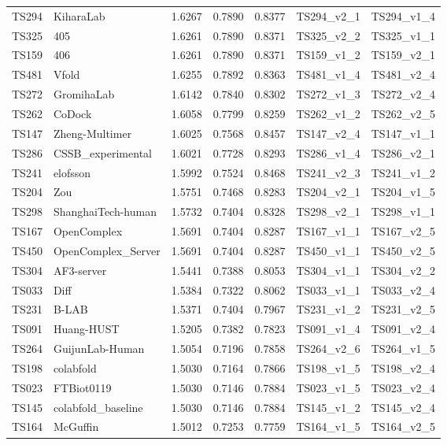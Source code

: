 \begin{table}[ht]
{\begin{tabular}{llrrrll}
TS294 & KiharaLab & 1.6267 & 0.7890 & 0.8377 & TS294\_v2\_1 & TS294\_v1\_4 \\ 
TS325 & 405 & 1.6261 & 0.7890 & 0.8371 & TS325\_v2\_2 & TS325\_v1\_1 \\ 
TS159 & 406 & 1.6261 & 0.7890 & 0.8371 & TS159\_v1\_2 & TS159\_v2\_1 \\ 
TS481 & Vfold & 1.6255 & 0.7892 & 0.8363 & TS481\_v1\_4 & TS481\_v2\_4 \\ 
TS272 & GromihaLab & 1.6142 & 0.7840 & 0.8302 & TS272\_v1\_3 & TS272\_v2\_4 \\ 
TS262 & CoDock & 1.6058 & 0.7799 & 0.8259 & TS262\_v1\_2 & TS262\_v2\_5 \\ 
TS147 & Zheng-Multimer & 1.6025 & 0.7568 & 0.8457 & TS147\_v2\_4 & TS147\_v1\_1 \\ 
TS286 & CSSB\_experimental & 1.6021 & 0.7728 & 0.8293 & TS286\_v1\_4 & TS286\_v2\_1 \\ 
TS241 & elofsson & 1.5992 & 0.7524 & 0.8468 & TS241\_v2\_3 & TS241\_v1\_2 \\ 
TS204 & Zou & 1.5751 & 0.7468 & 0.8283 & TS204\_v2\_1 & TS204\_v1\_5 \\ 
TS298 & ShanghaiTech-human & 1.5732 & 0.7404 & 0.8328 & TS298\_v2\_1 & TS298\_v1\_1 \\ 
TS167 & OpenComplex & 1.5691 & 0.7404 & 0.8287 & TS167\_v1\_1 & TS167\_v2\_5 \\ 
TS450 & OpenComplex\_Server & 1.5691 & 0.7404 & 0.8287 & TS450\_v1\_1 & TS450\_v2\_5 \\ 
TS304 & AF3-server & 1.5441 & 0.7388 & 0.8053 & TS304\_v1\_1 & TS304\_v2\_2 \\ 
TS033 & Diff & 1.5384 & 0.7322 & 0.8062 & TS033\_v1\_1 & TS033\_v2\_4 \\ 
TS231 & B-LAB & 1.5371 & 0.7404 & 0.7967 & TS231\_v1\_2 & TS231\_v2\_5 \\ 
TS091 & Huang-HUST & 1.5205 & 0.7382 & 0.7823 & TS091\_v1\_4 & TS091\_v2\_4 \\ 
TS264 & GuijunLab-Human & 1.5054 & 0.7196 & 0.7858 & TS264\_v2\_6 & TS264\_v1\_5 \\ 
TS198 & colabfold & 1.5030 & 0.7164 & 0.7866 & TS198\_v1\_5 & TS198\_v2\_4 \\ 
TS023 & FTBiot0119 & 1.5030 & 0.7146 & 0.7884 & TS023\_v1\_5 & TS023\_v2\_4 \\ 
TS145 & colabfold\_baseline & 1.5030 & 0.7146 & 0.7884 & TS145\_v1\_2 & TS145\_v2\_4 \\ 
TS164 & McGuffin & 1.5012 & 0.7253 & 0.7759 & TS164\_v1\_5 & TS164\_v2\_5 \\ 

\end{tabular}}
\end{table}
